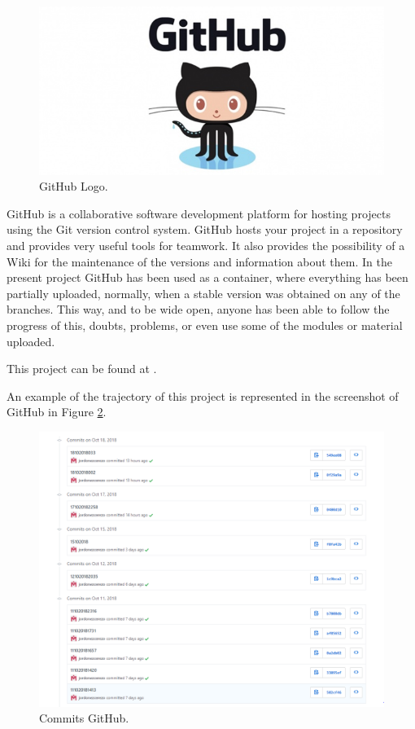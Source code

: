 \begin{figure}[H]
	\center
	\includegraphics[trim = 0mm 0mm 0mm 0mm, clip,scale=0.4]{imagenes/Introduction/github}
	\caption{GitHub Logo.}
	\label{fig:github}
\end{figure}


GitHub is a collaborative software development platform for hosting projects using the Git version control system. GitHub hosts your project in a repository and provides very useful tools for teamwork.\newline
It also provides the possibility of a Wiki for the maintenance of the versions and information about them.\newline
In the present project GitHub has been used as a container, where everything has been partially uploaded, normally, when a stable version was obtained on any of the branches.\newline
This way, and to be wide open, anyone has been able to follow the progress of this, doubts, problems, or even use some of the modules or material uploaded.\newline
 
This project can be found at \cite{Repo_GitHub}. \newline  

An example of the trajectory of this project is represented in the screenshot of GitHub in Figure \ref{fig:capturaGit}.

\begin{figure}[H]
	\center
	\includegraphics[trim = 0mm 0mm 0mm 0mm, clip,scale=0.5]{imagenes/Introduction/CapturaGit}
	\caption{Commits GitHub.}
	\label{fig:capturaGit}
\end{figure}

